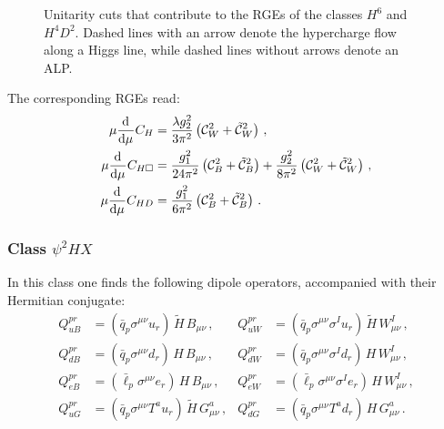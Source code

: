 \begin{figure}[h]
\caption{Unitarity cuts that contribute to the RGEs of the classes $H^6$ and $H^4 D^2$. Dashed lines with an arrow denote the hypercharge flow along a Higgs line, while dashed lines without arrows denote an ALP.}
\label{fig:classH6}
\end{figure}

The corresponding RGEs read:
\begin{align}
\mu \dv[]{}{\mu} {C}_{H} &= \frac{\lambda  g_2^2}{3\pi^2}  \left(\mathcal{C}_{W}^2+ \tilde{\mathcal{C}}_{W}^2 \right)\,,  \\
\mu \dv[]{}{\mu} {C}_{H\Box} &= \frac{g_1^2}{24\pi^2}   \left(\mathcal{C}_{B}^2+ \tilde{\mathcal{C}}_{B}^2\right)+ \frac{g_2^2}{8\pi^2}  \left(\mathcal{C}_{W}^2+ \tilde{\mathcal{C}}_{W}^2\right)\,, \\
\mu \dv[]{}{\mu} {C}_{HD} &= \frac{g_1^2}{6\pi^2}   \left (\mathcal{C}_{B}^2+ \tilde{\mathcal{C}}_{B}^2 \right)\,.
\end{align}
%

\subsubsection{Class $\psi^2 H X$}

In this class one finds the following dipole operators, accompanied with their Hermitian conjugate: 
\begin{align}
Q_{uB}^{pr} &= (\bar{q}_p\sigma^{\mu\nu} u_r)\,\tilde H\,B_{\mu\nu}\,,  &Q_{uW}^{pr} &= (\bar{q}_p\sigma^{\mu\nu} \sigma^I u_r)\,\tilde H\,W^I_{\mu\nu}\,, \\
 Q_{dB}^{pr} &= (\bar{q}_p\sigma^{\mu\nu} d_r)\,H\,B_{\mu\nu}\,,  & Q_{dW}^{pr} &= (\bar{q}_p\sigma^{\mu\nu} \sigma^I d_r)\,H\,W^I_{\mu\nu} \,,  \\
Q_{eB}^{pr} &= (\bar{\ell}_p\sigma^{\mu\nu} e_r)\,H\,B_{\mu\nu}\,, &Q_{eW}^{pr} &= (\bar{\ell}_p\sigma^{\mu\nu} \sigma^I e_r)\,H\,W^I_{\mu\nu}\,, \\
Q_{uG}^{pr} &= (\bar{q}_p\sigma^{\mu\nu} T^a u_r)\,\tilde H\,G^a_{\mu\nu}\,, & Q_{dG}^{pr} &= (\bar{q}_p\sigma^{\mu\nu} T^a d_r)\,H\,G^a_{\mu\nu}\,.
\end{align}

